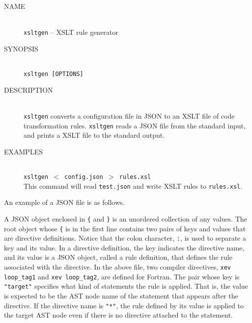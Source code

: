 \begin{framed}
\begin{description}
 \item[NAME]~\\
	    \texttt{xsltgen} -- XSLT rule generator

 \item[SYNOPSIS]~\\
	    \texttt{xsltgen [OPTIONS] }

 \item[DESCRIPTION]~\\ \texttt{xsltgen} converts a configuration file in
	    JSON to an XSLT file of code transformation rules.
	    \texttt{xsltgen} reads a JSON file from the standard input,
	    and prints a XSLT file to the standard
	    output.

 \item[EXAMPLES]~\\ \texttt{xsltgen $<$ config.json $>$ rules.xsl}\\ This command
	    will read \texttt{test.json} and write XSLT rules to \texttt{rules.xsl}.
\end{description}
\end{framed}

An example of a JSON file is as follows.
\begin{framed}
\end{framed}

A JSON object enclosed in \texttt{\{} and \texttt{\}} is an unordered
collection of any values. The root object whose \texttt{\{} is in the
first line contains two pairs of keys and values that are directive
definitions.  Notice that the colon character, \texttt{:}, is used to
separate a key and its value. In a directive definition, the key
indicates the directive name, and its value is a JSON object, called a
rule definition, that defines the rule associated with the directive.
In the above file, two compiler directives, \texttt{xev loop\_tag1} and
\texttt{xev loop\_tag2}, are defined for Fortran.  The pair whose key is
\texttt{"target"} specifies what kind of statements the rule is
applied. That is, the value is expected to be the AST node name of the
statement that appears after the directive.  If the directive name is
\texttt{"*"}, the rule defined by its value is applied to the target AST
node even if there is no directive attached to the statement.

